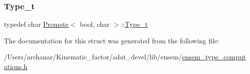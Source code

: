 \subsubsection{\texorpdfstring{Type\_t}{Type\_t}\hspace{0.1cm}{\footnotesize\ttfamily [2/2]}}
{\footnotesize\ttfamily typedef char \mbox{\hyperlink{structPromote}{Promote}}$<$ bool, char $>$\+::\mbox{\hyperlink{structPromote_3_01bool_00_01char_01_4_ae241f014309954a164eb7d94f35e3adc}{Type\+\_\+t}}}



The documentation for this struct was generated from the following file\+:\begin{DoxyCompactItemize}
\item 
/\+Users/archanar/\+Kinematic\+\_\+factor/adat\+\_\+devel/lib/ensem/\mbox{\hyperlink{lib_2ensem_2ensem__type__computations_8h}{ensem\+\_\+type\+\_\+computations.\+h}}\end{DoxyCompactItemize}
